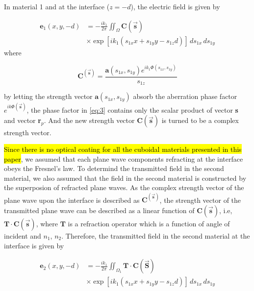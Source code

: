\documentclass[9pt,twocolumn,twoside]{osajnl}
\begin{document}
In material 1 and at the interface ($z=-d$), the electric field is given by

\begin{equation}\label{eq:3}
	\begin{aligned}
		\textbf{e}_1(x,y,-d)&=-\frac{ik_1}{2\pi}\iint_\Omega\textbf{C}(\vec{\mathbf{s}})\\
	&\times\exp[ik_1(s_{1x}x+s_{1y}y-s_{1z}d)]\,ds_{1x}\,ds_{1y}	
	\end{aligned}
\end{equation}
where 

\begin{equation}
	\textbf{C}^(\vec{\mathbf{s}})=\frac{\textbf{a}(s_{1x},s_{1y})e^{ik_1\Phi(s_{1x},s_{1y})}}{s_{1z}}
\end{equation}\label{eq:4}

by letting the strength vector $\mathbf{a}(s_{1x},s_{1y})$ absorb the aberration phase factor $e^{ik\Phi(\vec{\mathbf{s}})}$, the phase factor in \eqref{eq:3} contains only the scalar product of vector \textbf{s} and vector \textbf{r}$_p$. And the new strength vector $\textbf{C}(\vec{\mathbf{s}})$ is turned to be a complex strength vector.

\hl{Since there is no optical coating for all the cuboidal materials presented in this paper}, we assumed that each plane wave components refracting at the interface obeys the Fresnel's law. To determind the transmitted field in the second material, we also assumed that the field in the second material is constructed by the superposion of refracted plane waves. As the complex strength vector of the plane wave upon the interface is described as $\textbf{C}^(\vec{\textbf{s}})$, the strength vector of the transmitted plane wave can be described as a linear function of $\textbf{C}(\vec{\textbf{s}})$, i.e, $\textbf{T}\cdot\textbf{C}(\vec{\textbf{s}})$, where $\mathbf{T}$ is a refraction operator which is a function of angle of incident and $n_1$, $n_2$. Therefore, the transmitted field in the second material at the interface is given by 

\begin{equation}\label{eq:5}
	\begin{aligned}
		\textbf{e}_2(x,y,-d)&=-\frac{ik_1}{2\pi}\iint_{\Omega_1}\textbf{T}\cdot\textbf{C}(\vec{\textbf{S}})\\
		&\times\exp[ik_1(s_{1x}x+s_{1y}y-s_{1z}d)]\,ds_{1x}\,ds_{1y}		
	\end{aligned}
\end{equation}
\end{document}
